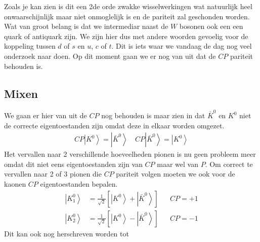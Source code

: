 \documentclass[../main.tex]{subfiles}
\begin{document}
Zoals je kan zien is dit een 2de orde zwakke wisselwerkingen wat natuurlijk heel onwaarschijnlijk maar niet onmoglelijk is en de pariteit zal geschonden worden. Wat van groot belang is dat we intermediar naast de $W$ bosonen ook een een quark of antiquark zijn. We zijn hier dus met andere woorden gevoelig voor de koppeling tussen $d$ of $s$ en $u$, $c$ of $t$. Dit is iets waar we vandaag de dag nog veel onderzoek naar doen. Op dit moment gaan we er nog van uit dat de $CP$ pariteit behouden is.

\subsection{Mixen}%
\label{sub:mixen}

We gaan er hier van uit de $CP$ nog behouden is maar zien in dat $\bar{K}^{0}$ en $K^{0}$ niet de correcte eigentoestanden zijn omdat deze in elkaar worden omgezet.
\begin{equation}
    \begin{aligned}
        \label{eq:cp_anti_kaon}
        C P\left|K^{0}\right>=\left| \bar{K}^{0}\right>\quad C P\left|\bar{K}^{0}\right>=\left| K^{0}\right>
    \end{aligned}
\end{equation}
Het vervallen naar 2 verschillende hoeveelheden pionen is nu geen probleem meer omdat dit niet eens eigentoestanden zijn van $CP$ maar wel van $P$. Om correct te vervallen naar 2 of 3 pionen die $CP$ pariteit volgen moeten we ook voor de kaonen $CP$ eigentoestanden bepalen.
\begin{equation}
    \begin{aligned}
        \label{eq:kaon_cp_eigentoestanden}
        \left| K_{1}^{0}\right>&=\frac{1}{\sqrt{2}}\left[\left|K^{0}\right>+\left| \bar{K}^{0}\right>\right] & & C P=+1 \\
        \left| K_{2}^{0}\right>&=\frac{1}{\sqrt{2}}\left[\left|K^{0}\right>-\left| \bar{K}^{0}\right>\right] & & C P=-1
    \end{aligned}
\end{equation}
Dit kan ook nog herschreven worden tot
\end{document}
